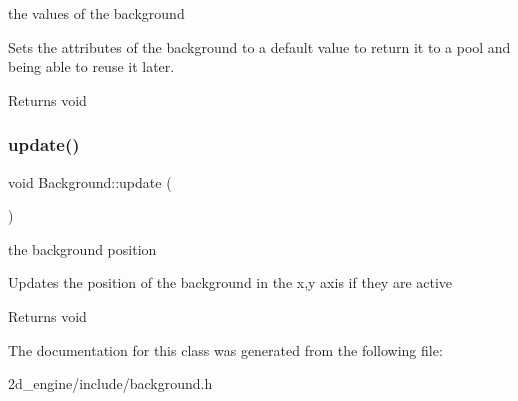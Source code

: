 the values of the background

Sets the attributes of the background to a default value to return it to a pool and being able to reuse it later.

\begin{DoxyReturn}{Returns}
void 
\end{DoxyReturn}
\mbox{\label{class_background_acab58b65d4299d4bd51b8376e8c3e3d3}} 
\subsubsection{\texorpdfstring{update()}{update()}}
{\footnotesize\ttfamily void Background\+::update (\begin{DoxyParamCaption}{ }\end{DoxyParamCaption})}

the background position

Updates the position of the background in the x,y axis if they are active

\begin{DoxyReturn}{Returns}
void 
\end{DoxyReturn}


The documentation for this class was generated from the following file\+:\begin{DoxyCompactItemize}
\item 
2d\+\_\+engine/include/background.\+h\end{DoxyCompactItemize}
